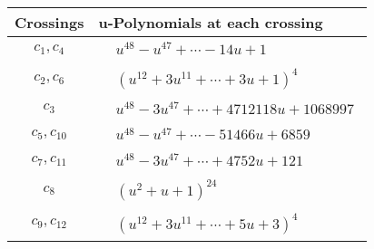 \documentclass[1p]{elsarticle_modified}
\theoremstyle{definition}
\begin{document}
\begin{tabular}{m{50pt}|m{274pt}}
Crossings & \hspace{64pt}u-Polynomials at each crossing \\
\hline $$\begin{aligned}c_{1},c_{4}\end{aligned}$$&$\begin{aligned}
&u^{48}- u^{47}+\cdots-14 u+1
\end{aligned}$\\
\hline $$\begin{aligned}c_{2},c_{6}\end{aligned}$$&$\begin{aligned}
&(u^{12}+3 u^{11}+\cdots+3 u+1)^{4}
\end{aligned}$\\
\hline $$\begin{aligned}c_{3}\end{aligned}$$&$\begin{aligned}
&u^{48}-3 u^{47}+\cdots+4712118 u+1068997
\end{aligned}$\\
\hline $$\begin{aligned}c_{5},c_{10}\end{aligned}$$&$\begin{aligned}
&u^{48}- u^{47}+\cdots-51466 u+6859
\end{aligned}$\\
\hline $$\begin{aligned}c_{7},c_{11}\end{aligned}$$&$\begin{aligned}
&u^{48}-3 u^{47}+\cdots+4752 u+121
\end{aligned}$\\
\hline $$\begin{aligned}c_{8}\end{aligned}$$&$\begin{aligned}
&(u^2+u+1)^{24}
\end{aligned}$\\
\hline $$\begin{aligned}c_{9},c_{12}\end{aligned}$$&$\begin{aligned}
&(u^{12}+3 u^{11}+\cdots+5 u+3)^{4}
\end{aligned}$\\
\hline
\end{tabular}\\~\\
\newpage\renewcommand{\arraystretch}{1}
\end{document}
